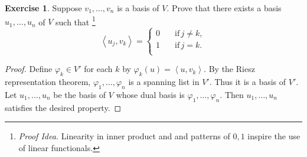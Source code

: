 \documentclass[nofonts,colorlinks]{tufte-handout}
\theoremstyle{plain} %
\theoremstyle{definition}
\newtheorem{exer}[thm]{Exercise}
\theoremstyle{remark}
\def\idea{\textit{\color[rgb]{0,0,.55}Proof Idea. }}
\newcommand{\norm}[1]{\mathopen{}\left\lVert#1\right\rVert}
\newcommand{\inp}[2]{\mathopen{}\left\langle#1,#2\right\rangle}
\renewcommand{\phi}{\varphi}
\newcommand{\C}{\mathbf{C}}
\newcommand{\F}{\mathbf{F}}
\renewcommand{\L}{\mathcal{L}}
\newcommand{\M}{\mathcal{M}}
\begin{document}

\begin{exer}
	Suppose $v_1,\dots,v_n$ is a basis of $V$. Prove that there exists a basis $u_1,\dots,u_n$ of $V$ such that%
	\footnote{\idea Linearity in inner product and and patterns of $0,1$ inspire the use of linear functionals.}
	\[\inp{u_j}{v_k}=\left\{\begin{aligned}
		0 \quad & \text{if}\, j\neq k,\\
		1 \quad & \text{if}\, j=k.\\
	\end{aligned}\right.\]
\end{exer}
\begin{proof}
	Define $\phi_k\in V'$ for each $k$ by $\phi_k(u)=\inp{u}{v_k}$. By the Riesz representation theorem, $\phi_1,\dots,\phi_n$ is a spanning list in $V'$. Thus it is a basis of $V'$. Let $u_1,\dots,u_n$ be the basis of $V$ whose dual basis is $\phi_1,\dots,\phi_n$. Then $u_1,\dots,u_n$ satisfies the desired property.
\end{proof}
\end{document}
